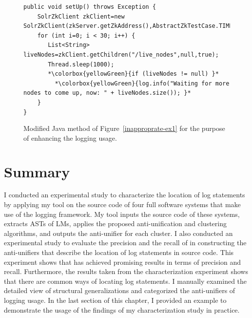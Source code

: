 \begin{figure}[p]
\def\baselinestretch{1}
\begin{lstlisting}[escapechar=*]
public void setUp() throws Exception {
    SolrZkClient zkClient=new SolrZkClient(zkServer.getZkAddress(),AbstractZkTestCase.TIMEOUT);
    for (int i=0; i < 30; i++) {
       List<String> liveNodes=zkClient.getChildren("/live_nodes",null,true);
       Thread.sleep(1000);
       *\colorbox{yellowGreen}{if (liveNodes != null) }*
         *\colorbox{yellowGreen}{log.info("Waiting for more nodes to come up, now: " + liveNodes.size()); }*
    }
}
\end{lstlisting}
\caption[Modified Java method of Figure~\protect\ref{inapproprate-ex1} for the purpose of enhancing the logging usage.]{Modified Java method of Figure~\ref{inapproprate-ex1} for the purpose of enhancing the logging usage.\label{approprate-ex1}}
\end{figure}

\section{Summary}
I conducted an experimental study to characterize the location of log statements by applying my tool on the source code of four full software systems that make use of the  logging framework. My tool inputs the source code of these systems, extracts ASTs of LMs, applies the proposed anti-unification and clustering algorithms, and outputs the anti-unifier for each cluster. I also conducted an experimental study to evaluate the precision and the recall of  in constructing the anti-unifiers that describe the location of log statements in source code. This experiment shows that  has achieved promising results in terms of precision and recall. Furthermore, the results taken from the characterization experiment shows that there are common ways of locating log statements. I manually examined the detailed view of structural generalizations and categorized the anti-unifiers of logging usage. In the last section of this chapter, I provided an example to demonstrate the usage of the findings of my characterization study in practice.




